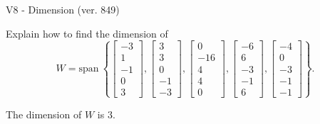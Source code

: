 \begin{exercise}
  \begin{exerciseTitle}V8 - Dimension (ver. 849)\end{exerciseTitle}
  \begin{exerciseStatement}
    Explain how to find the dimension of 
\[W=\mathrm{span}\ \left\{\left[\begin{array}{r}
-3 \\
1 \\
-1 \\
0 \\
3
\end{array}\right] , \left[\begin{array}{r}
3 \\
3 \\
0 \\
-1 \\
-3
\end{array}\right] , \left[\begin{array}{r}
0 \\
-16 \\
4 \\
4 \\
0
\end{array}\right] , \left[\begin{array}{r}
-6 \\
6 \\
-3 \\
-1 \\
6
\end{array}\right] , \left[\begin{array}{r}
-4 \\
0 \\
-3 \\
-1 \\
-1
\end{array}\right]\right\}.\]



  \end{exerciseStatement}
  \begin{exerciseAnswer}
   The dimension of \(W\) is  \(3\).
  


  \end{exerciseAnswer}
\end{exercise}